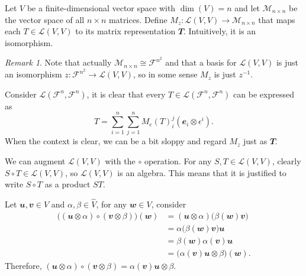 \documentclass[math, code]{amznotes}
\theoremstyle{remark}
\newtheorem*{remark}{Remark}
\begin{document}
Let $V$ be a finite-dimensional vector space with $\dim(V) = n$ and let $\mathcal{M}_{n \times n}$ be the vector space of all $n \times n$ matrices. Define $M_z \colon \mathcal{L}(V, V) \to \mathcal{M}_{n \times n}$ that maps each $T \in \mathcal{L}(V, V)$ to its matrix representation $\mathbfit{T}$. Intuitively, it is an isomorphism.

\begin{notebox}
    \begin{remark}
        Note that actually $\mathcal{M}_{n \times n} \cong \mathcal{F}^{n^2}$ and that a basis for $\mathcal{L}(V, V)$ is just an isomorphism $z \colon \mathcal{F}^{n^2} \to \mathcal{L}(V, V)$, so in some sense $M_z$ is just $z^{-1}$.
    \end{remark}
\end{notebox}

Consider $\mathcal{L}(\mathcal{F}^n, \mathcal{F}^n)$, it is clear that every $T \in \mathcal{L}(\mathcal{F}^n, \mathcal{F}^n)$ can be expressed as
\begin{equation*}
    T = \sum_{i = 1}^{n}\sum_{j = 1}^{n}M_e(T)_i^j\left(\mathbfit{e}_i \otimes \epsilon^i\right).
\end{equation*}
When the context is clear, we can be a bit sloppy and regard $M_z$ just as $\mathbfit{T}$.

We can augment $\mathcal{L}(V, V)$ with the $\circ$ operation. For any $S, T \in \mathcal{L}(V, V)$, clearly $S \circ T \in \mathcal{L}(V, V)$, so $\mathcal{L}(V, V)$ is an algebra. This means that it is justified to write $S \circ T$ as a product $ST$.

Let $\mathbfit{u}, \mathbfit{v} \in V$ and $\alpha, \beta \in \hat{V}$, for any $\mathbfit{w} \in V$, consider
\begin{align*}
    \bigl((\mathbfit{u} \otimes \alpha) \circ (\mathbfit{v} \otimes \beta)\bigr)(\mathbfit{w}) & = (\mathbfit{u} \otimes \alpha)\bigl(\beta(\mathbfit{w})\mathbfit{v}\bigr) \\
    & = \alpha\bigl(\beta(\mathbfit{w})\mathbfit{v}\bigr)\mathbfit{u} \\
    & = \beta(\mathbfit{w})\alpha(\mathbfit{v})\mathbfit{u} \\
    & = \bigl(\alpha(\mathbfit{v})\mathbfit{u} \otimes \beta\bigr)(\mathbfit{w}).
\end{align*}
Therefore, $(\mathbfit{u} \otimes \alpha) \circ (\mathbfit{v} \otimes \beta) = \alpha(\mathbfit{v})\mathbfit{u} \otimes \beta$.
\end{document}
